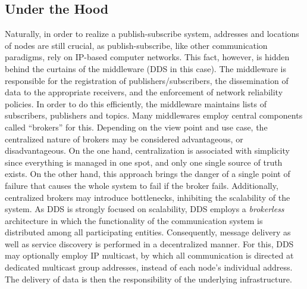 \subsection{Under the Hood}
Naturally, in order to realize a publish-subscribe system, addresses and locations of nodes are still crucial, as publish-subscribe, like other communication paradigms, rely on IP-based computer networks. This fact, however, is hidden behind the curtains of the middleware (DDS in this case). The middleware is responsible for the registration of publishers/subscribers, the dissemination of data to the appropriate receivers, and the enforcement of network reliability policies. In order to do this efficiently, the middleware maintains lists of subscribers, publishers and topics. Many middlewares employ central components called ``brokers'' for this. Depending on the view point and use case, the centralized nature of brokers may be considered advantageous, or disadvantageous. On the one hand, centralization is associated with simplicity since everything is managed in one spot, and only one single source of truth exists. On the other hand, this approach brings the danger of a single point of failure that causes the whole system to fail if the broker fails. Additionally, centralized brokers may introduce bottlenecks, inhibiting the scalability of the system. 
As DDS is strongly focused on scalability, DDS employs a \emph{brokerless} architecture in which the functionality of the communication system is distributed among all participating entities. Consequently, message delivery as well as service discovery is performed in a decentralized manner.
For this, DDS may optionally employ IP multicast, by which all communication is directed at dedicated multicast group addresses, instead of each node's individual address. The delivery of data is then the responsibility of the underlying infrastructure.

